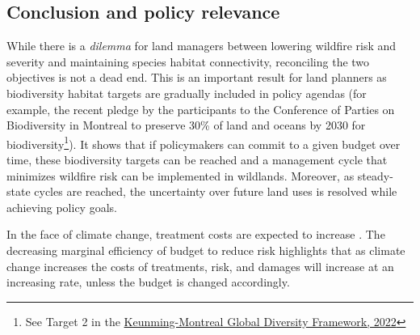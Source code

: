 

\subsection{Conclusion and policy relevance}
While there is a \textit{dilemma} for land managers between lowering wildfire risk and severity and maintaining species habitat connectivity, reconciling the two objectives is not a dead end. This is an important result for land planners as biodiversity habitat targets are gradually included in policy agendas (for example, the recent pledge by the participants to the Conference of Parties on Biodiversity in Montreal to preserve 30\% of land and oceans by 2030 for biodiversity\footnote{See Target 2 in the \href{https://www.cbd.int/article/cop15-cbd-press-release-final-19dec2022 }{Keunming-Montreal Global Diversity Framework, 2022}}). It shows that if policymakers can commit to a given budget over time, these biodiversity targets can be reached and a management cycle that minimizes wildfire risk can be implemented in wildlands. Moreover, as steady-state cycles are reached, the uncertainty over future land uses is resolved while achieving policy goals.

In the face of climate change, treatment costs are expected to increase \citep{Kupfer2020}. The decreasing marginal efficiency of budget to reduce risk highlights that as climate change increases the costs of treatments, risk, and damages will increase at an increasing rate, unless the budget is changed accordingly.

